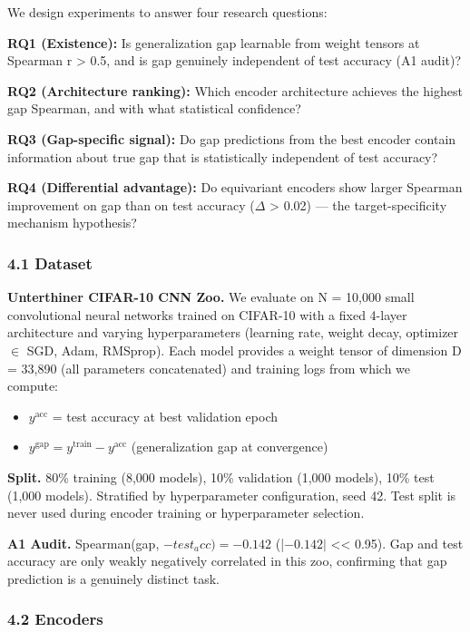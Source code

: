 
We design experiments to answer four research questions:

\textbf{RQ1 (Existence):} Is generalization gap learnable from weight tensors at Spearman r > 0.5, and is
gap genuinely independent of test accuracy (A1 audit)?

\textbf{RQ2 (Architecture ranking):} Which encoder architecture achieves the highest gap Spearman, and with
what statistical confidence?

\textbf{RQ3 (Gap-specific signal):} Do gap predictions from the best encoder contain information about true
gap that is statistically independent of test accuracy?

\textbf{RQ4 (Differential advantage):} Do equivariant encoders show larger Spearman improvement on gap than
on test accuracy ($\Delta$ > 0.02) --- the target-specificity mechanism hypothesis?

\subsubsection{4.1 Dataset}

\textbf{Unterthiner CIFAR-10 CNN Zoo.} We evaluate on N = 10,000 small convolutional neural networks trained
on CIFAR-10 with a fixed 4-layer architecture and varying hyperparameters (learning rate, weight decay,
optimizer $\in$ {SGD, Adam, RMSprop}). Each model provides a weight tensor of dimension D = 33,890 (all
parameters concatenated) and training logs from which we compute:
\begin{itemize}
\item $y^{\text{acc}}$ = test accuracy at best validation epoch
\item $y^{\text{gap}} = y^{\text{train}} - y^{\text{acc}}$ (generalization gap at convergence)
\end{itemize}

\textbf{Split.} 80\% training (8,000 models), 10\% validation (1,000 models), 10\% test (1,000 models).
Stratified by hyperparameter configuration, seed 42. Test split is never used during encoder training
or hyperparameter selection.

\textbf{A1 Audit.} Spearman(gap, $-test_acc) = -0.142$ (|$-0.142|$ << 0.95). Gap and test accuracy are only
weakly negatively correlated in this zoo, confirming that gap prediction is a genuinely distinct task.

\subsubsection{4.2 Encoders}

